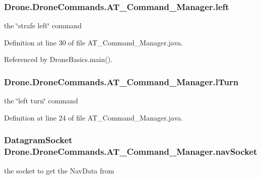 \subsubsection[{left}]{ Drone.\+Drone\+Commands.\+A\+T\+\_\+\+Command\+\_\+\+Manager.\+left\hspace{0.3cm}{\ttfamily [private]}}\label{class_drone_1_1_drone_commands_1_1_a_t___command___manager_a0c85483dd42046af9882d140f8eb9d12}
the \char`\"{}strafe left\char`\"{} command 

Definition at line 30 of file A\+T\+\_\+\+Command\+\_\+\+Manager.\+java.



Referenced by Drone\+Basics.\+main().

\hypertarget{class_drone_1_1_drone_commands_1_1_a_t___command___manager_ad5d87d1abcf6a08d4cd69a2bab032588}{}
\subsubsection[{l\+Turn}]{ Drone.\+Drone\+Commands.\+A\+T\+\_\+\+Command\+\_\+\+Manager.\+l\+Turn\hspace{0.3cm}{\ttfamily [private]}}\label{class_drone_1_1_drone_commands_1_1_a_t___command___manager_ad5d87d1abcf6a08d4cd69a2bab032588}
the \char`\"{}left turn\char`\"{} command 

Definition at line 24 of file A\+T\+\_\+\+Command\+\_\+\+Manager.\+java.

\hypertarget{class_drone_1_1_drone_commands_1_1_a_t___command___manager_a09258643671eccda829e54409d25e14c}{}
\subsubsection[{nav\+Socket}]{\setlength{\rightskip}{0pt plus 5cm}Datagram\+Socket Drone.\+Drone\+Commands.\+A\+T\+\_\+\+Command\+\_\+\+Manager.\+nav\+Socket\hspace{0.3cm}{\ttfamily [private]}}\label{class_drone_1_1_drone_commands_1_1_a_t___command___manager_a09258643671eccda829e54409d25e14c}
the socket to get the Nav\+Data from 

